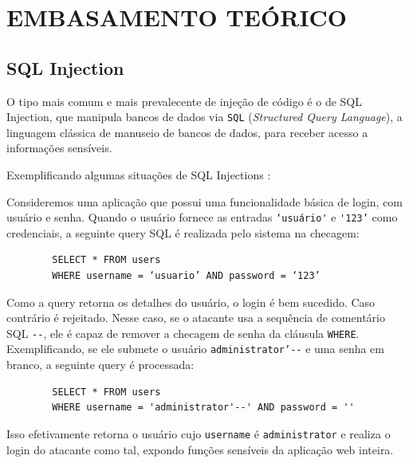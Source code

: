 \chapter{EMBASAMENTO TEÓRICO}
\label{chp:capitulo3}

\section{SQL Injection}


O tipo mais comum e mais prevalecente de injeção de código é o de SQL Injection, que manipula bancos de dados via \verb+SQL+ (\textit{Structured Query Language}), a linguagem clássica de manuseio de bancos de dados, para receber acesso a informações sensíveis.

Exemplificando algumas situações de SQL Injections \cite{sql_port_swigger}:

\begin{alineas}
    \item 
    Consideremos uma aplicação que possui uma funcionalidade básica de login, com usuário e senha. Quando o usuário fornece as entradas \verb+‘usuário'+ e \verb+'123’+ como credenciais, a seguinte query SQL é realizada pelo sistema na checagem:
    
    \begin{verbatim}
        SELECT * FROM users 
        WHERE username = ‘usuario’ AND password = ‘123’
    \end{verbatim}
    
    Como a query retorna os detalhes do usuário, o login é bem sucedido. Caso contrário  é rejeitado. Nesse caso, se o atacante usa a sequência de comentário SQL \verb+--+, ele é capaz de remover a checagem de senha da cláusula \verb+WHERE+. Exemplificando, se ele submete o usuário \verb+administrator’--+ e uma senha em branco, a seguinte query é processada:
    
    \begin{verbatim}
        SELECT * FROM users 
        WHERE username = 'administrator'--' AND password = '' 
    \end{verbatim}
    
    Isso efetivamente retorna o usuário cujo \verb+username+ é \verb+administrator+ e realiza o login do atacante como tal, expondo funções sensíveis da aplicação web inteira.

\end{alineas}

